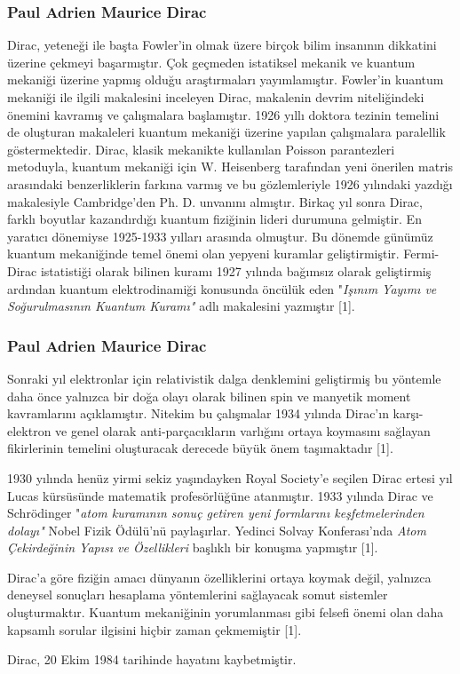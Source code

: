 \documentclass[aspectratio=169,10pt]{beamer}
\begin{document}
\begin{frame}[allowframebreaks]
\frametitle{Paul Adrien Maurice Dirac}


 Dirac, yeteneği ile başta Fowler'in olmak üzere birçok bilim insanının dikkatini üzerine çekmeyi başarmıştır. Çok geçmeden istatiksel mekanik ve kuantum mekaniği üzerine yapmış olduğu araştırmaları yayımlamıştır. Fowler'in kuantum mekaniği ile ilgili makalesini inceleyen Dirac, makalenin devrim niteliğindeki önemini kavramış ve çalışmalara başlamıştır. 1926 yıllı doktora tezinin temelini de oluşturan makaleleri kuantum mekaniği üzerine yapılan çalışmalara paralellik göstermektedir. Dirac, klasik mekanikte kullanılan Poisson parantezleri metoduyla, kuantum mekaniği için W. Heisenberg tarafından yeni önerilen matris arasındaki benzerliklerin farkına varmış ve bu gözlemleriyle 1926 yılındaki yazdığı makalesiyle Cambridge'den Ph. D. unvanını almıştır. Birkaç yıl sonra Dirac, farklı boyutlar kazandırdığı kuantum fiziğinin lideri durumuna gelmiştir. En yaratıcı dönemiyse 1925-1933 yılları arasında olmuştur. Bu dönemde günümüz kuantum mekaniğinde temel önemi olan yepyeni kuramlar geliştirmiştir. Fermi-Dirac istatistiği olarak bilinen kuramı 1927 yılında bağımsız olarak geliştirmiş ardından kuantum elektrodinamiği konusunda öncülük eden "\textit{Işınım Yayımı ve Soğurulmasının Kuantum Kuramı"} adlı makalesini yazmıştır [1].



\end{frame}

\begin{frame}[allowframebreaks]
\frametitle{Paul Adrien Maurice Dirac}


Sonraki yıl elektronlar için relativistik dalga denklemini geliştirmiş bu yöntemle daha önce yalnızca bir doğa olayı olarak bilinen spin ve manyetik moment kavramlarını açıklamıştır. Nitekim bu çalışmalar 1934 yılında Dirac'ın karşı-elektron ve genel olarak anti-parçacıkların varlığını ortaya koymasını sağlayan fikirlerinin temelini oluşturacak derecede büyük önem taşımaktadır [1]. 

1930 yılında henüz yirmi sekiz yaşındayken Royal Society'e seçilen Dirac ertesi yıl Lucas kürsüsünde matematik profesörlüğüne atanmıştır. 1933 yılında Dirac ve Schrödinger "\textit{atom kuramının sonuç getiren yeni formlarını keşfetmelerinden dolayı"} Nobel Fizik Ödülü'nü paylaşırlar. Yedinci Solvay Konferası'nda \textit{Atom Çekirdeğinin Yapısı ve Özellikleri} başlıklı bir konuşma yapmıştır [1].

Dirac'a göre fiziğin amacı dünyanın özelliklerini ortaya koymak değil, yalnızca deneysel sonuçları hesaplama yöntemlerini sağlayacak somut sistemler oluşturmaktır. Kuantum mekaniğinin yorumlanması gibi felsefi önemi olan daha kapsamlı sorular ilgisini hiçbir zaman çekmemiştir [1].

Dirac, 20 Ekim 1984 tarihinde hayatını kaybetmiştir.


\end{frame}
	
\end{document}
